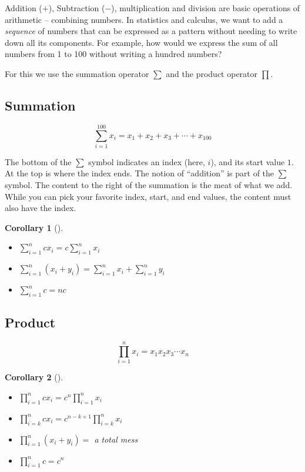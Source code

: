 \documentclass[
  letterpaper,
]{book}
\providecommand{\tightlist}{%
  \setlength{\itemsep}{0pt}\setlength{\parskip}{0pt}}\usepackage{longtable,booktabs,array}
\theoremstyle{definition}
\theoremstyle{definition}
\theoremstyle{plain}
\theoremstyle{definition}
\theoremstyle{plain}
\theoremstyle{plain}
\newtheorem{corollary}{Corollary}[chapter]
\theoremstyle{remark}
\begin{document}
Addition (\(+\)), Subtraction (\(-\)), multiplication and division are
basic operations of arithmetic -- combining numbers. In statistics and
calculus, we want to add a \emph{sequence} of numbers that can be
expressed as a pattern without needing to write down all its components.
For example, how would we express the sum of all numbers from 1 to 100
without writing a hundred numbers?

For this we use the summation operator \(\sum\) and the product operator
\(\prod\).

\hypertarget{summation-1}{%
\subsection*{Summation}\label{summation-1}}

\[
\sum\limits_{i=1}^{100} x_i = x_1+x_2+x_3+\cdots+x_{100}
\]

The bottom of the \(\sum\) symbol indicates an index (here, \(i\)), and
its start value \(1\). At the top is where the index ends. The notion of
``addition'' is part of the \(\sum\) symbol. The content to the right of
the summation is the meat of what we add. While you can pick your
favorite index, start, and end values, the content must also have the
index.

\leavevmode{}%
\begin{corollary}[]\label{cor-summation}

\begin{itemize}
\tightlist
\item
  \(\sum\limits_{i=1}^n c x_i = c \sum\limits_{i=1}^n x_i\)
\item
  \(\sum\limits_{i=1}^n (x_i + y_i) = \sum\limits_{i=1}^n x_i + \sum\limits_{i=1}^n y_i\)
\item
  \(\sum\limits_{i=1}^n c = n c\)
\end{itemize}

\end{corollary}

\hypertarget{product}{%
\subsection*{Product}\label{product}}

\[
\prod\limits_{i=1}^n x_i = x_1 x_2 x_3 \cdots x_n
\]

\leavevmode{}%
\begin{corollary}[]\label{cor-product}

\begin{itemize}
\tightlist
\item
  \(\prod\limits_{i=1}^n c x_i = c^n \prod\limits_{i=1}^n x_i\)
\item
  \(\prod\limits_{i=k}^n c x_i = c^{n-k+1} \prod\limits_{i=k}^n x_i\)
\item
  \(\prod\limits_{i=1}^n (x_i + y_i) =\) a total mess
\item
  \(\prod\limits_{i=1}^n c = c^n\)
\end{itemize}

\end{corollary}
\end{document}

